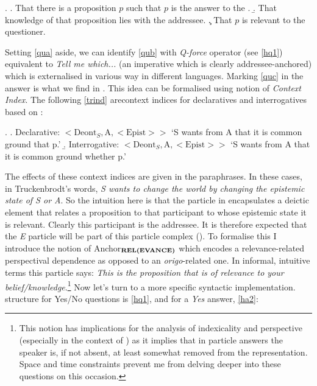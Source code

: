 \documentclass[output=paper]{LSP/langsci}
\begin{document}
\Lsciex.
\a. That there is a proposition $p$ such that $p$ is the answer to the . \label{qua}
\b. That knowledge of that proposition lies with the addressee. \label{qub} 
\c. That $p$  is relevant to the questioner.  \label{quc}


Setting \ref{qua} aside, we can identify \ref{qub} with  \textit{Q-force} operator (see \ref{hq1}) equivalent to \textit{Tell me which...} (an imperative which is clearly addressee-anchor\-ed) which is externalised in various way in different languages.  Marking \ref{quc} in the answer is what we find in .  This idea can be formalised using  notion of \textit{Context Index}.  The following \ref{trind} are\largerpage context indices for declaratives and interrogatives based on  \citet{truckenbrodt:06}:

\Lsciex. \label{trind}
\a. Declarative: $<\text{Deont}_{S}, \text{A}, <\text{Epist}> >$ 
\glt `S wants from A that it is common ground that p.'
\b. Interrogative: $<\text{Deont}_{S}, \text{A}, <\text{Epist}> >$ 
\glt `S wants from A that it is common ground whether p.'


The effects of these context indices are given in the paraphrases.  In these cases, in Truckenbrodt's words, \textit{S wants to change the world by changing the epistemic state of S or A}.  So the intuition here is that the particle \nai in  encapsulates a deictic element that relates a proposition to that participant to whose epistemic state it is relevant.  Clearly this participant is the addressee.  It is therefore expected that the \textit{E} particle will be part of this particle complex (\nai). To formalise this I introduce the notion of Anchor$_{\text{\textbf{REL(EVANCE)}}}$ which encodes a relevance-related perspectival dependence as opposed to an \textit{origo}-related one.  In informal, intuitive terms this particle says: \textit{This is the proposition that is of relevance to your belief/knowledge}.\footnote{This notion has implications for the analysis of indexicality and perspective (especially in the context of \cite{giorgi:10,hinzen-sheehan:13}) as it implies that in particle answers the speaker is, if not absent, at least somewhat removed from the representation. Space and time constraints prevent me from delving deeper into  these questions on this occasion.}   Now let's turn to a more specific syntactic implementation.  structure for Yes/No questions is \ref{hq1}, and for a \textit{Yes} answer, \ref{ha2}:
\end{document}
